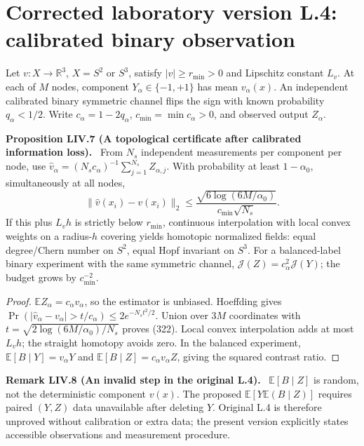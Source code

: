 \documentclass[11pt,a4paper,oneside]{book}
\newcommand{\R}{\mathbb R}\newcommand{\C}{\mathbb C}\newcommand{\Z}{\mathbb Z}\newcommand{\N}{\mathbb N}\newcommand{\Q}{\mathbb Q}
\newcommand{\statement}[3]{\par\medskip\noindent\textbf{#1 #2 (#3).}\ }
\begin{document}
\section{Corrected laboratory version L.4: calibrated binary observation}
Let $v:X\to\R^3$, $X=S^2$ or $S^3$, satisfy $|v|\ge r_{\min}>0$ and Lipschitz constant $L_v$. At each of $M$ nodes, component $Y_\alpha\in\{-1,+1\}$ has mean $v_\alpha(x)$. An independent calibrated binary symmetric channel flips the sign with known probability $q_\alpha<1/2$. Write $c_\alpha=1-2q_\alpha$, $c_{\min}=\min c_\alpha>0$, and observed output $Z_\alpha$.
\statement{Proposition}{LIV.7}{A topological certificate after calibrated information loss}
From $N_s$ independent measurements per component per node, use $\widehat v_\alpha=(N_sc_\alpha)^{-1}\sum_{j=1}^{N_s}Z_{\alpha,j}$. With probability at least $1-\alpha_0$, simultaneously at all nodes,
\begin{equation}\|\widehat v(x_i)-v(x_i)\|_2\le\frac{\sqrt{6\log(6M/\alpha_0)}}{c_{\min}\sqrt{N_s}}.\tag{322}\end{equation}
If this plus $L_vh$ is strictly below $r_{\min}$, continuous interpolation with local convex weights on a radius-$h$ covering yields homotopic normalized fields: equal degree/Chern number on $S^2$, equal Hopf invariant on $S^3$. For a balanced-label binary experiment with the same symmetric channel, $\mathcal J(Z)=c_\alpha^2\mathcal J(Y)$; the budget grows by $c_{\min}^{-2}$.
\begin{proof}
$\mathbb EZ_\alpha=c_\alpha v_\alpha$, so the estimator is unbiased. Hoeffding gives $\Pr(|\widehat v_\alpha-v_\alpha|>t/c_\alpha)\le2e^{-N_st^2/2}$. Union over $3M$ coordinates with $t=\sqrt{2\log(6M/\alpha_0)/N_s}$ proves (322). Local convex interpolation adds at most $L_vh$; the straight homotopy avoids zero. In the balanced experiment, $\mathbb E[B\mid Y]=v_\alpha Y$ and $\mathbb E[B\mid Z]=c_\alpha v_\alpha Z$, giving the squared contrast ratio.
\end{proof}
\statement{Remark}{LIV.8}{An invalid step in the original L.4}
$\mathbb E[B\mid Z]$ is random, not the deterministic component $v(x)$. The proposed $\mathbb E[Y\mathbb E(B\mid Z)]$ requires paired $(Y,Z)$ data unavailable after deleting $Y$. Original L.4 is therefore unproved without calibration or extra data; the present version explicitly states accessible observations and measurement procedure.
\end{document}
